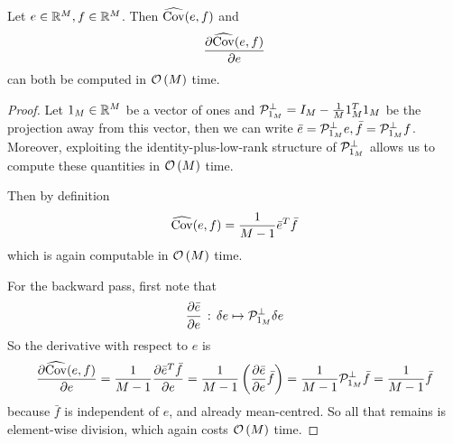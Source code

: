 \begin{lemma}\label{lem:backprop-empirical-covariance}
Let $e \in \mathbb{R}^{M}, f \in \mathbb{R}^{M}$.
Then $\widehat{\mathrm{Cov}}(e, f)$ and
\begin{align*}
    \frac{\partial \widehat{\mathrm{Cov}}(e, f)} {\partial e}
\end{align*}
can both be computed in $\mathcal{O}\left({M}\right)$ time.
\end{lemma}
\begin{proof}
    Let $\mathrm{1}_{{M}} \in \mathbb{R}^M$ be a vector of ones and $\mathcal{P}_{\mathrm{1}_{{M}}}^\perp = I_M - \frac{1}{M} \mathrm{1}_{{M}}^T \mathrm{1}_{{M}}$ be the projection away from this vector, then we can write $\bar{e} = \mathcal{P}_{\mathrm{1}_{{M}}}^\perp e, \bar{f} = \mathcal{P}_{\mathrm{1}_{{M}}}^\perp f$.
    Moreover, exploiting the identity-plus-low-rank structure of $\mathcal{P}_{\mathrm{1}_{{M}}}^\perp$ allows us to compute these quantities in $\mathcal{O}\left({M}\right)$ time.

    Then by definition
    \begin{align*}
        \widehat{\mathrm{Cov}}(e, f) = \frac{1}{M-1} \bar{e}^T \bar{f}
    \end{align*}
    which is again computable in $\mathcal{O}\left({M}\right)$ time.

    For the backward pass, first note that
    \begin{align*}
        \frac{\partial \bar{e}}{\partial e} \, : \, \delta e \mapsto \mathcal{P}_{\mathrm{1}_{{M}}}^\perp \delta e
    \end{align*}
    So the derivative with respect to $e$ is
    \begin{align*}
        \frac{\partial \widehat{\mathrm{Cov}}(e, f)} {\partial e} = \frac{1}{M-1} \frac{\partial \bar{e}^T \bar{f}}{\partial e}
        = \frac{1}{M-1} \left( \frac{\partial \bar{e}}{\partial e} \bar{f}  \right)
        = \frac{1}{M-1} \mathcal{P}_{\mathrm{1}_{{M}}}^\perp \bar{f}
        = \frac{1}{M-1}\bar{f}
    \end{align*}
    because $\bar{f}$ is independent of $e$, and already mean-centred.
    So all that remains is element-wise division, which again costs $\mathcal{O}\left({M}\right)$ time.
\end{proof}


